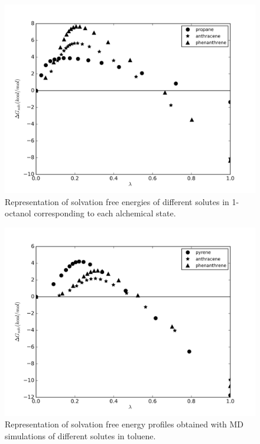 \documentclass[final,12p,times,twocolumn]{elsarticle}
\begin{document}
		\begin{figure}
			\centering
			\includegraphics[width=1.0\linewidth]{Figures/octart}
			\caption{Representation of solvation free energies of different solutes in 1-octanol corresponding to each alchemical state.}
			\label{fig:oct}
		\end{figure}
		
		\begin{figure}
			\centering
			\includegraphics[width=1.0\linewidth]{Figures/tolart}
			\caption{Representation of solvation free energy profiles obtained with MD simulations of different solutes in toluene. }
			\label{fig:tol}
		\end{figure}
	
\end{document}
